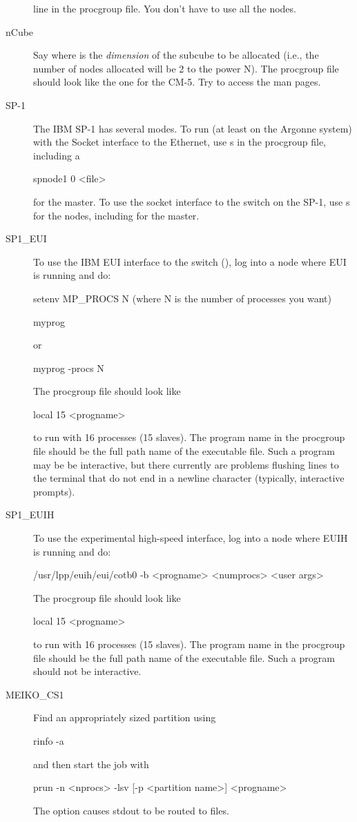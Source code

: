 \begin{description}
  line in the procgroup file.  You don't have to use all the nodes.
\item[nCube] Say  where  is the {\em
  dimension\/} of the subcube to be allocated (i.e., the number of nodes
  allocated will be 2 to the power N).  The procgroup file should look like
  the one for the CM-5.  Try  to access the man pages.
\item[SP-1] The IBM SP-1 has several modes.  To run (at least on the Argonne
  system) with the Socket interface to the Ethernet, use s in
  the procgroup file, including a
\begin{example}
  spnode1 0 <file>
\end{example}
  for the master.  To use the socket interface to the switch on the SP-1, use
  s for the nodes, including  for the master.
\item[SP1_EUI] To use the IBM EUI interface to the switch
  (), log into a node where EUI is running and do:
\begin{example}
  setenv MP_PROCS N  (where N is the number of processes you want)

     myprog
\end{example}
   or
\begin{example}
  myprog -procs N
\end{example}
  The procgroup file  should look like 
\begin{example}
  local 15 <progname>
\end{example}
to run with 16 processes (15 slaves).  The program name in the procgroup file
should be the full path name of the executable file.  Such a program may be
be interactive, but there currently are problems flushing lines to the
terminal that do not end in a newline character (typically, interactive
prompts). 
\item[SP1_EUIH] To use the experimental high-speed interface, log into a node
  where EUIH is running and do:
\begin{example}

  /usr/lpp/euih/eui/cotb0 -b <progname> <numprocs> <user args>

\end{example}

The procgroup file should look like 
\begin{example}
  local 15 <progname>
\end{example}
to run with 16 processes (15 slaves).  The program name in the procgroup file
should be the full path name of the executable file.  Such a program should
not be interactive.
\item[MEIKO_CS1] Find an appropriately sized partition using
\begin{example}
  rinfo -a
\end{example}
and then start the job with
\begin{example}
  prun -n <nprocs> -lsv [-p <partition name>] <progname>
\end{example}
The  option causes stdout to be routed to files.
\end{description}


